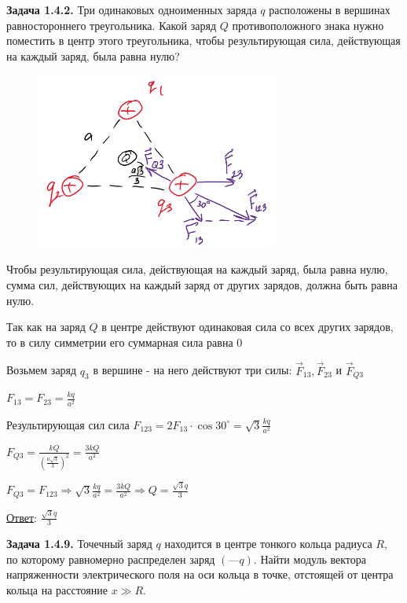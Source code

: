 \documentclass[12pt]{article}
\begin{document}
\begin{tcolorbox}
    \textbf{Задача 1.4.2.} Три одинаковых одноименных заряда $q$
    расположены в вершинах равностороннего треугольника. Какой
    заряд $Q$ противоположного знака нужно поместить в центр этого
    треугольника, чтобы результирующая сила, действующая на
    каждый заряд, была равна нулю?
\end{tcolorbox}

\begin{minipage}{\textwidth}
    \begin{figure}
        \includegraphics[width=8cm]{physics1/images/physics1_homework_6_1}
    \end{figure}

    Чтобы результирующая сила, действующая на каждый заряд, была равна нулю, сумма сил, 
    действующих на каждый заряд от других зарядов, должна быть равна нулю.

    Так как на заряд $Q$ в центре действуют одинаковая сила со всех других зарядов, то в силу симметрии его суммарная сила равна 0 

    Возьмем заряд $q_3$ в вершине - на него действуют три силы: $\vec{F}_{13}, \vec{F}_{23}$ и $\vec{F}_{Q3}$

    $F_{13} = F_{23} = \frac{kq}{a^2}$

    Результирующая сил сила $F_{123} = 2F_{13} \cdot \cos 30^\circ = \sqrt{3}\frac{kq}{a^2}$

    $F_{Q3} = \frac{kQ}{\left(\frac{a\sqrt{3}}{3}\right)^2} = \frac{3kQ}{a^2}$

    $F_{Q3} = F_{123} \Longrightarrow \sqrt{3}\frac{kq}{a^2} = \frac{3kQ}{a^2} \Longrightarrow Q = \frac{\sqrt{3}q}{3}$
\end{minipage}

\underline{Ответ}: $\frac{\sqrt{3}q}{3}$


\clearpage

\begin{tcolorbox}
    \textbf{Задача 1.4.9.} Точечный заряд $q$ находится в центре тонкого
    кольца радиуса $R$, по которому равномерно распределен заряд $(—q)$.
    Найти модуль вектора напряженности электрического поля на оси
    кольца в точке, отстоящей от центра кольца на расстояние $x \gg R$.
\end{tcolorbox}
\end{document}
